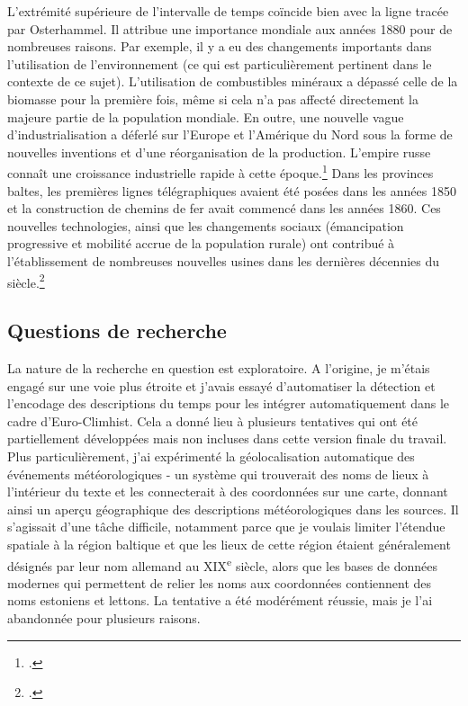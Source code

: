 \documentclass[a4paper,twoside,12pt]{article}
\begin{document}
L'extrémité supérieure de l'intervalle de temps coïncide bien avec la ligne tracée par Osterhammel. Il attribue une importance mondiale aux années 1880 pour de nombreuses raisons. Par exemple, il y a eu des changements importants dans l'utilisation de l'environnement (ce qui est particulièrement pertinent dans le contexte de ce sujet). L'utilisation de combustibles minéraux a dépassé celle de la biomasse pour la première fois, même si cela n'a pas affecté directement la majeure partie de la population mondiale. En outre, une nouvelle vague d'industrialisation a déferlé sur l'Europe et l'Amérique du Nord sous la forme de nouvelles inventions et d'une réorganisation de la production. L'empire russe connaît une croissance industrielle rapide à cette époque.\footcite[63-64]{osterhammel_transformation_2014} Dans les provinces baltes, les premières lignes télégraphiques avaient été posées dans les années 1850 et la construction de chemins de fer avait commencé dans les années 1860. Ces nouvelles technologies, ainsi que les changements sociaux (émancipation progressive et mobilité accrue de la population rurale) ont contribué à l'établissement de nombreuses nouvelles usines dans les dernières décennies du siècle.\footcite[154-161]{andresen_eesti_2010}





\subsection*{Questions de recherche} \label{questions}

La nature de la recherche en question est exploratoire. A l'origine, je m'étais engagé sur une voie plus étroite et j'avais essayé d'automatiser la détection et l'encodage des descriptions du temps pour les intégrer automatiquement dans le cadre d'Euro-Climhist. Cela a donné lieu à plusieurs tentatives qui ont été partiellement développées mais non incluses dans cette version finale du travail. Plus particulièrement, j'ai expérimenté la géolocalisation automatique des événements météorologiques - un système qui trouverait des noms de lieux à l'intérieur du texte et les connecterait à des coordonnées sur une carte, donnant ainsi un aperçu géographique des descriptions météorologiques dans les sources. Il s'agissait d'une tâche difficile, notamment parce que je voulais limiter l'étendue spatiale à la région baltique et que les lieux de cette région étaient généralement désignés par leur nom allemand au XIX\textsuperscript{e} siècle, alors que les bases de données modernes qui permettent de relier les noms aux coordonnées contiennent des noms estoniens et lettons. La tentative a été modérément réussie, mais je l'ai abandonnée pour plusieurs raisons.
\end{document}
